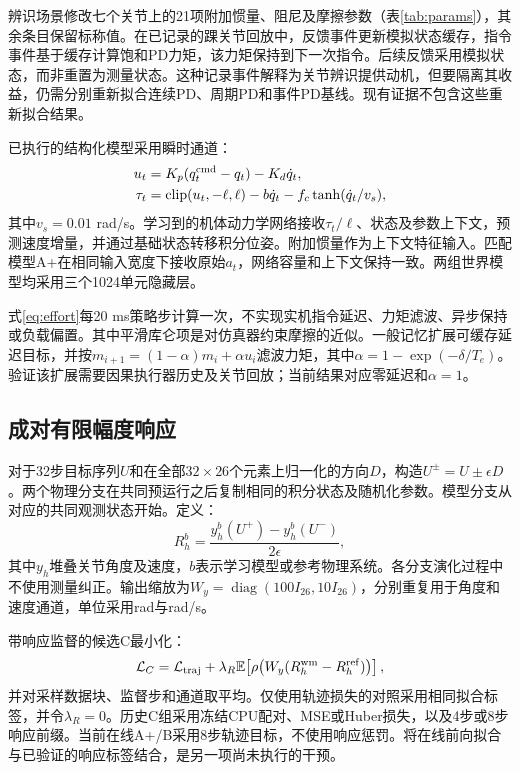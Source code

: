 辨识场景修改七个关节上的21项附加惯量、阻尼及摩擦参数（表\ref{tab:params}），其余条目保留标称值。在已记录的踝关节回放中，反馈事件更新模拟状态缓存，指令事件基于缓存计算饱和PD力矩，该力矩保持到下一次指令。后续反馈采用模拟状态，而非重置为测量状态。这种记录事件解释为关节辨识提供动机，但要隔离其收益，仍需分别重新拟合连续PD、周期PD和事件PD基线。现有证据不包含这些重新拟合结果。

已执行的结构化模型采用瞬时通道：
\begin{equation}
\begin{aligned}
u_t&=K_p(q^{\mathrm{cmd}}_t-q_t)-K_d\dot q_t,\\
\tau_t&=\operatorname{clip}(u_t,-\ell,\ell)-b\dot q_t-f_c\tanh(\dot q_t/v_s),
\end{aligned}\label{eq:effort}
\end{equation}
其中$v_s=0.01$ rad/s。学习到的机体动力学网络接收$\tau_t/\ell$、状态及参数上下文，预测速度增量，并通过基础状态转移积分位姿。附加惯量作为上下文特征输入。匹配模型A+在相同输入宽度下接收原始$a_t$，网络容量和上下文保持一致。两组世界模型均采用三个1024单元隐藏层。

式\eqref{eq:effort}每20 ms策略步计算一次，不实现实机指令延迟、力矩滤波、异步保持或负载偏置。其中平滑库仑项是对仿真器约束摩擦的近似。一般记忆扩展可缓存延迟目标，并按$m_{i+1}=(1-\alpha)m_i+\alpha u_i$滤波力矩，其中$\alpha=1-\exp(-\delta/T_e)$。验证该扩展需要因果执行器历史及关节回放；当前结果对应零延迟和$\alpha=1$。



\subsection{成对有限幅度响应}
对于32步目标序列$U$和在全部$32\times26$个元素上归一化的方向$D$，构造$U^\pm=U\pm\epsilon D$。两个物理分支在共同预运行之后复制相同的积分状态及随机化参数。模型分支从对应的共同观测状态开始。定义：
\begin{equation}
R_h^b=\frac{y_h^b(U^+)-y_h^b(U^-)}{2\epsilon},
\label{eq:response}
\end{equation}
其中$y_h$堆叠关节角度及速度，$b$表示学习模型或参考物理系统。各分支演化过程中不使用测量纠正。输出缩放为$W_y=\operatorname{diag}(100I_{26},10I_{26})$，分别重复用于角度和速度通道，单位采用rad与rad/s。

带响应监督的候选C最小化：
\begin{equation}
\mathcal L_C=\mathcal L_{\mathrm{traj}}+\lambda_R
\mathbb{E}\!\left[\rho\!\left(W_y(R_h^{\mathrm{wm}}-R_h^{\mathrm{ref}})\right)\right],
\label{eq:loss}
\end{equation}
并对采样数据块、监督步和通道取平均。仅使用轨迹损失的对照采用相同拟合标签，并令$\lambda_R=0$。历史C组采用冻结CPU配对、MSE或Huber损失，以及4步或8步响应前缀。当前在线A+/B采用8步轨迹目标，不使用响应惩罚。将在线前向拟合与已验证的响应标签结合，是另一项尚未执行的干预。

